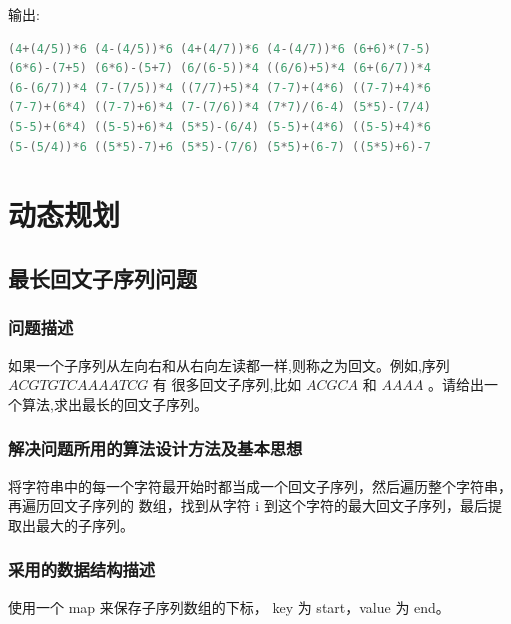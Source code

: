\documentclass{ctexart}
\begin{document}
输出:
\begin{lstlisting}[language=C]
(4+(4/5))*6 (4-(4/5))*6 (4+(4/7))*6 (4-(4/7))*6 (6+6)*(7-5) 
(6*6)-(7+5) (6*6)-(5+7) (6/(6-5))*4 ((6/6)+5)*4 (6+(6/7))*4 
(6-(6/7))*4 (7-(7/5))*4 ((7/7)+5)*4 (7-7)+(4*6) ((7-7)+4)*6 
(7-7)+(6*4) ((7-7)+6)*4 (7-(7/6))*4 (7*7)/(6-4) (5*5)-(7/4) 
(5-5)+(6*4) ((5-5)+6)*4 (5*5)-(6/4) (5-5)+(4*6) ((5-5)+4)*6 
(5-(5/4))*6 ((5*5)-7)+6 (5*5)-(7/6) (5*5)+(6-7) ((5*5)+6)-7
\end{lstlisting}

\newpage
\section{动态规划}
\subsection{最长回文子序列问题}
\subsubsection{问题描述}
如果一个子序列从左向右和从右向左读都一样,则称之为回文。例如,序列 $ACGTGTCAAAATCG$ 有
很多回文子序列,比如 $ACGCA$ 和 $AAAA$ 。请给出一个算法,求出最长的回文子序列。
\subsubsection{解决问题所用的算法设计方法及基本思想}
将字符串中的每一个字符最开始时都当成一个回文子序列，然后遍历整个字符串，再遍历回文子序列的
数组，找到从字符 i 到这个字符的最大回文子序列，最后提取出最大的子序列。
\subsubsection{采用的数据结构描述}
使用一个 map 来保存子序列数组的下标， key 为 start，value 为 end。
\end{document}
